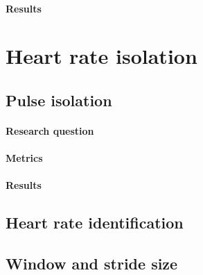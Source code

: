 \paragraph{Results}



\section{Heart rate isolation}
\subsection{Pulse isolation}
\label{section:bss}
\paragraph{Research question}
\paragraph{Metrics}
\paragraph{Results}
\label{section:ica_assumption}
\subsection{Heart rate identification}
\subsection{Window and stride size}
